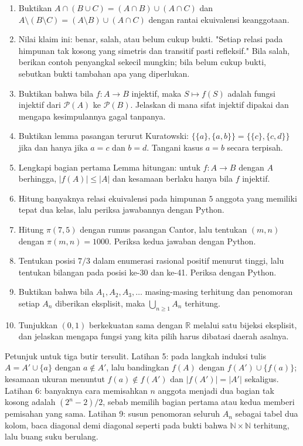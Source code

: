\begin{latihan}
\begin{enumerate}
  \item Buktikan $A \cap (B \cup C) = (A \cap B) \cup (A \cap C)$ dan
        $A \setminus (B \setminus C) = (A \setminus B) \cup (A \cap C)$ dengan rantai
        ekuivalensi keanggotaan.
  \item Nilai klaim ini: benar, salah, atau belum cukup bukti. "Setiap relasi pada
        himpunan tak kosong yang simetris dan transitif pasti refleksif." Bila salah,
        berikan contoh penyangkal sekecil mungkin; bila belum cukup bukti, sebutkan
        bukti tambahan apa yang diperlukan.
  \item Buktikan bahwa bila $f : A \to B$ injektif, maka $S \mapsto f(S)$ adalah
        fungsi injektif dari $\mathcal{P}(A)$ ke $\mathcal{P}(B)$. Jelaskan di mana
        sifat injektif dipakai dan mengapa kesimpulannya gagal tanpanya.
  \item Buktikan lemma pasangan terurut Kuratowski:
        $\{\{a\},\{a,b\}\} = \{\{c\},\{c,d\}\}$ jika dan hanya jika $a = c$ dan
        $b = d$. Tangani kasus $a = b$ secara terpisah.
  \item Lengkapi bagian pertama Lemma hitungan: untuk $f : A \to B$ dengan $A$
        berhingga, $|f(A)| \le |A|$ dan kesamaan berlaku hanya bila $f$ injektif.
  \item Hitung banyaknya relasi ekuivalensi pada himpunan $5$ anggota yang memiliki
        tepat dua kelas, lalu periksa jawabannya dengan Python.
  \item Hitung $\pi(7,5)$ dengan rumus pasangan Cantor, lalu tentukan $(m,n)$ dengan
        $\pi(m,n) = 1000$. Periksa kedua jawaban dengan Python.
  \item Tentukan posisi $7/3$ dalam enumerasi rasional positif menurut tinggi, lalu
        tentukan bilangan pada posisi ke-30 dan ke-41. Periksa dengan Python.
  \item Buktikan bahwa bila $A_1, A_2, A_3, \dots$ masing-masing terhitung dan
        penomoran setiap $A_n$ diberikan eksplisit, maka $\bigcup_{n \ge 1} A_n$
        terhitung.
  \item Tunjukkan $(0,1)$ berkekuatan sama dengan $\mathbb{R}$ melalui satu bijeksi
        eksplisit, dan jelaskan mengapa fungsi yang kita pilih harus dibatasi daerah
        asalnya.
\end{enumerate}
\end{latihan}

Petunjuk untuk tiga butir tersulit. Latihan 5: pada langkah induksi tulis
$A = A' \cup \{a\}$ dengan $a \notin A'$, lalu bandingkan $f(A)$ dengan
$f(A') \cup \{f(a)\}$; kesamaan ukuran menuntut $f(a) \notin f(A')$ dan
$|f(A')| = |A'|$ sekaligus. Latihan 6: banyaknya cara memisahkan $n$ anggota menjadi
dua bagian tak kosong adalah $(2^{n}-2)/2$, sebab memilih bagian pertama atau kedua
memberi pemisahan yang sama. Latihan 9: susun penomoran seluruh $A_n$ sebagai tabel dua
kolom, baca diagonal demi diagonal seperti pada bukti bahwa
$\mathbb{N} \times \mathbb{N}$ terhitung, lalu buang suku berulang.

